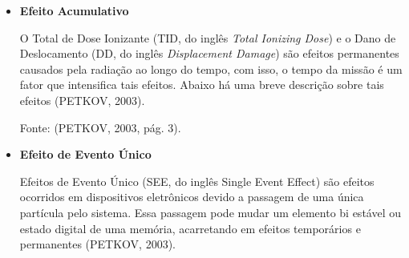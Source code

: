 \begin{itemize}
	\item \textbf{Efeito Acumulativo}
	
	O Total de Dose Ionizante (TID, do inglês \textit{Total Ionizing Dose}) e o Dano de Deslocamento (DD, do inglês \textit{Displacement Damage}) são efeitos permanentes causados pela radiação ao longo do tempo, com isso, o tempo da missão é um fator que intensifica tais efeitos. Abaixo há uma breve descrição sobre tais efeitos (PETKOV, 2003).
	
	\begin{table}[h]
		\centering
		\caption{Efeitos Acumulativos causada pela radiação espacial.}
		\label{tabela2}
	
	\centering
	\footnotesize{Fonte: (PETKOV, 2003, pág. 3).}
	
	\end{table}
	
	\newpage
	\item \textbf{ Efeito de Evento Único}
	
	Efeitos de Evento Único (SEE, do inglês Single Event Effect) são efeitos ocorridos em dispositivos eletrônicos devido a passagem de uma única partícula pelo sistema. Essa passagem pode mudar um elemento bi estável ou estado digital de uma memória, acarretando em efeitos temporários e permanentes (PETKOV, 2003).
	

\end{itemize}
